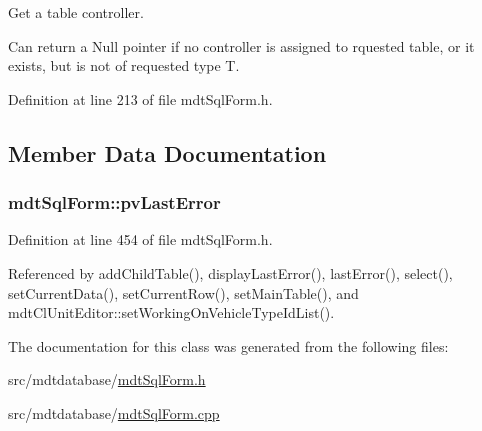 Get a table controller. 

Can return a Null pointer if no controller is assigned to rquested table, or it exists, but is not of requested type T. 

Definition at line 213 of file mdt\-Sql\-Form.\-h.



\subsection{Member Data Documentation}
\hypertarget{classmdt_sql_form_afc24e8dedd1249a29708347fdff560fd}{
\subsubsection[{pv\-Last\-Error}]{ mdt\-Sql\-Form\-::pv\-Last\-Error\hspace{0.3cm}{\ttfamily [protected]}}}\label{classmdt_sql_form_afc24e8dedd1249a29708347fdff560fd}


Definition at line 454 of file mdt\-Sql\-Form.\-h.



Referenced by add\-Child\-Table(), display\-Last\-Error(), last\-Error(), select(), set\-Current\-Data(), set\-Current\-Row(), set\-Main\-Table(), and mdt\-Cl\-Unit\-Editor\-::set\-Working\-On\-Vehicle\-Type\-Id\-List().



The documentation for this class was generated from the following files\-:\begin{DoxyCompactItemize}
\item 
src/mdtdatabase/\hyperlink{mdt_sql_form_8h}{mdt\-Sql\-Form.\-h}\item 
src/mdtdatabase/\hyperlink{mdt_sql_form_8cpp}{mdt\-Sql\-Form.\-cpp}\end{DoxyCompactItemize}
